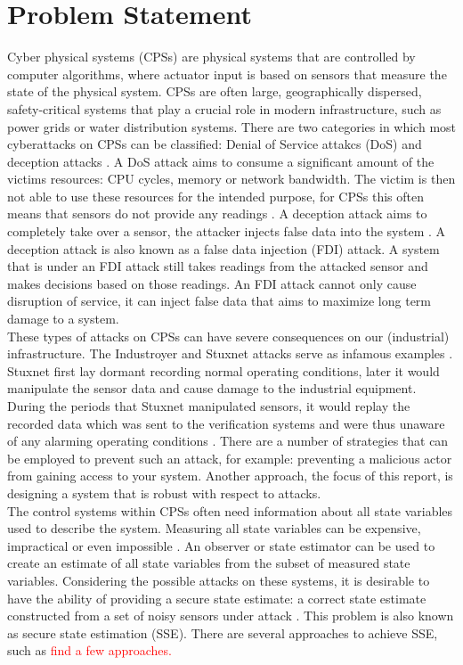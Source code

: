 \section{Problem Statement}
Cyber physical systems (CPSs) are physical systems that are controlled by computer algorithms, where actuator input is based on sensors that measure the state of the physical system. CPSs are often large, geographically dispersed, safety-critical systems that play a crucial role in modern infrastructure, such as power grids or water distribution systems. There are two categories in which most cyberattacks on CPSs can be classified: Denial of Service attakcs (DoS) and deception attacks \cite{Ding2021SecureSurvey}. A DoS attack aims to consume a significant amount of the victims resources: CPU cycles, memory or network bandwidth. The victim is then not able to use these resources for the intended purpose, for CPSs this often means that sensors do not provide any readings \cite{Yu2014AnAttacks}. A deception attack aims to completely take over a sensor, the attacker injects false data into the system \cite{Serpanos2022FalseSystems}. A deception attack is also known as a false data injection (FDI) attack. A system that is under an FDI attack still takes readings from the attacked sensor and makes decisions based on those readings. An FDI attack cannot only cause disruption of service, it can inject false data that aims to maximize long term damage to a system. \\ 

These types of attacks on CPSs can have severe consequences on our (industrial) infrastructure. The Industroyer and Stuxnet attacks serve as infamous examples \cite{Lameiras2022Industroyer:Grid}\cite{Kushner2013TheStuxnet}. Stuxnet first lay dormant recording normal operating conditions, later it would manipulate the sensor data and cause damage to the industrial equipment. During the periods that Stuxnet manipulated sensors, it would replay the recorded data which was sent to the verification systems and were thus unaware of any alarming operating conditions \cite{Fidler2011Was_Stuxnet_an_Act_of_War_Decoding_a_Cyberattack}. There are a number of strategies that can be employed to prevent such an attack, for example: preventing a malicious actor from gaining access to your system. Another approach, the focus of this report, is designing a system that is robust with respect to attacks. \\

The control systems within CPSs often need information about all state variables used to describe the system. Measuring all state variables can be expensive, impractical or even impossible \cite{yappa}. An observer or state estimator can be used to create an estimate of all state variables from the subset of measured state variables. Considering the possible attacks on these systems, it is desirable to have the ability of providing a secure state estimate: a correct state estimate constructed from a set of noisy sensors under attack \cite{Shoukry2017SecureApproach}. This problem is also known as secure state estimation (SSE). There are several approaches to achieve SSE, such as \textcolor{red}{find a few approaches.}

